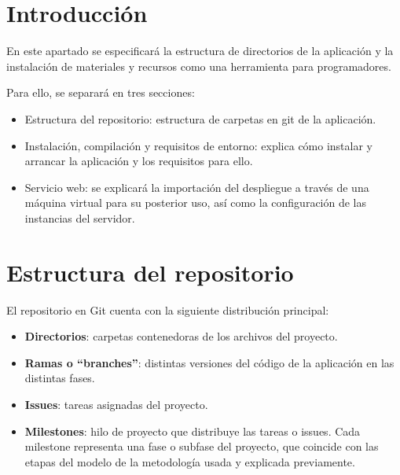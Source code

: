 
\section{Introducción}
En este apartado se especificará la estructura de directorios de la aplicación y la instalación de materiales y recursos como una herramienta para programadores.

Para ello, se separará en tres secciones:
\begin{itemize}
    \item Estructura del repositorio: estructura de carpetas en git de la aplicación.
    \item Instalación, compilación y requisitos de entorno: explica cómo instalar y arrancar la aplicación y los requisitos para ello.
    \item Servicio web: se explicará la importación del despliegue a través de una máquina virtual para su posterior uso, así como la configuración de las instancias del servidor.
\end{itemize}

\section{Estructura del repositorio}
El repositorio en Git cuenta con la siguiente distribución principal:
\begin{itemize}
    \item \textbf{Directorios}: carpetas contenedoras de los archivos del proyecto.
    \item \textbf{Ramas o ``branches''}: distintas versiones del código de la aplicación en las distintas fases.
    \item \textbf{Issues}: tareas asignadas del proyecto.
    \item \textbf{Milestones}: hilo de proyecto que distribuye las tareas o issues. Cada milestone representa una fase o subfase del proyecto, que coincide con las etapas del modelo de la metodología usada y explicada previamente.
\end{itemize}

